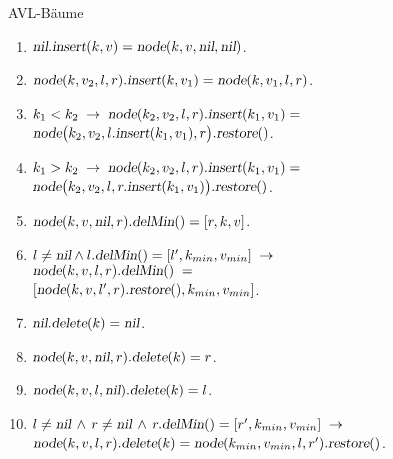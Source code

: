 \documentclass{slides}
\begin{document}
\begin{slide}{}
\normalsize

\begin{center}
AVL-B\"aume
\end{center}

\footnotesize
\begin{enumerate}
\item $\textsl{nil}\mathtt{.}\textsl{insert}(k,v) = \textsl{node}(k,v, \textsl{nil}, \textsl{nil})$.  
\item $\textsl{node}(k, v_2, l, r)\mathtt{.}\textsl{insert}(k,v_1) = \textsl{node}(k, v_1, l, r)$.
\item $k_1 < k_2 \;\rightarrow\; \textsl{node}(k_2, v_2, l, r)\mathtt{.}\textsl{insert}(k_1, v_1) =$ \\[0.1cm]
      \hspace*{3.1cm} 
      $\textsl{node}\bigl(k_2, v_2, l\mathtt{.}\textsl{insert}(k_1, v_1), r\bigr).\textsl{restore}()$.
\item $k_1 > k_2 \;\rightarrow \; \textsl{node}(k_2, v_2, l, r)\mathtt{.}\textsl{insert}(k_1, v_1) =$ \\[0.1cm]
      \hspace*{3.1cm}  
      $\textsl{node}\bigl(k_2, v_2, l, r\mathtt{.}\textsl{insert}(k_1, v_1)\bigr).\textsl{restore}()$.
\item $\textsl{node}(k, v, \textsl{nil}, r)\mathtt{.}\textsl{delMin}() = [r, k, v]$.
\item $l\not= \textsl{nil} \wedge l\mathtt{.}\textsl{delMin}() = [l',k_{min}, v_{min}] \;\rightarrow$ \\[0.1cm]
       \hspace*{3.1cm} 
       $\textsl{node}(k, v, l, r)\mathtt{.}\textsl{delMin}() \;=$ \\[0.1cm]
       \hspace*{3.1cm} 
       $[\textsl{node}(k, v, l', r).\textsl{restore}(), k_{min}, v_{min}]$.
\item $\textsl{nil}\mathtt{.}\textsl{delete}(k) = \textsl{nil}$.
\item $\textsl{node}(k,v,\textsl{nil},r)\mathtt{.}\textsl{delete}(k) = r$.
\item $\textsl{node}(k,v,l,\textsl{nil})\mathtt{.}\textsl{delete}(k) = l$.
\item $l \not= \textsl{nil} \,\wedge\, r \not= \textsl{nil} \,\wedge\, r\mathtt{.}\textsl{delMin}() = [r',k_{min}, v_{min}]  \;\rightarrow$ \\[0.1cm]
      $\textsl{node}(k,v,l,r)\mathtt{.}\textsl{delete}(k) = \textsl{node}(k_{min},v_{min},l,r').\textsl{restore}()$.

\end{enumerate}
\end{slide}
\end{document}
